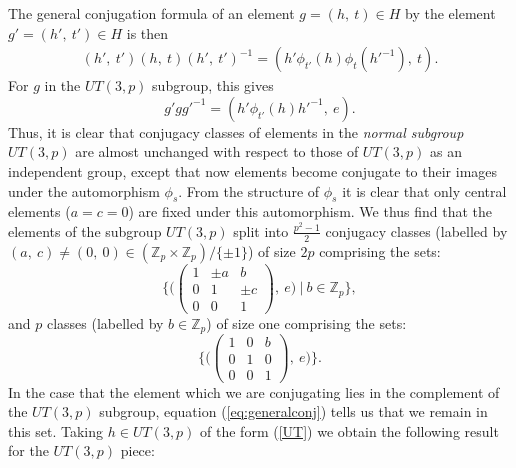 \documentclass[12pt]{article}
\theoremstyle{definition}
\begin{document}
The general conjugation formula of an element $g = (h,~t) \in H$ by the element $g' = (h',~t') \in H$ is then
\begin{equation}
\begin{gathered}
(h',~t')(h,~t)(h',~t')^{-1}  = (h'\phi_{t'}(h)\phi_t(h'^{-1}),~t).
\end{gathered}
\label{eq:generalconj}
\end{equation}
For $g$ in the $UT(3,p)$ subgroup, this gives
\begin{equation}
g'gg'^{-1} = (h'\phi_{t'}(h)h'^{-1},~e).
\end{equation}
Thus, it is clear that conjugacy classes of elements in the {\it normal subgroup} $UT(3,p)$ are almost unchanged with respect to those of $UT(3,p)$ as an independent group, except that now elements become conjugate to their images under the automorphism $\phi_s$. From the structure of $\phi_s$ it is clear that only central elements ($a=c=0$) are fixed under this automorphism. We thus find that the elements of the subgroup $UT(3,p)$ split into $\frac{p^2-1}{2}$ conjugacy classes (labelled by $(a,~c) \neq (0,~0) \in (\mathbb{Z}_p \times \mathbb{Z}_p)/\{\pm 1\}$) of size $2p$ comprising the sets:
\begin{equation}
\bigg\{ \bigg(
\begin{pmatrix}
1 & \pm a & b \\
0 & 1 & \pm c \\
0 & 0 & 1
\end{pmatrix},~e \bigg)~|~b \in \mathbb{Z}_p \bigg\},
\end{equation}
and $p$ classes (labelled by $b \in \mathbb{Z}_p$) of size one comprising the sets:
\begin{equation}
\bigg\{ \bigg(
\begin{pmatrix}
1 & 0 & b \\
0 & 1 & 0 \\
0 & 0 & 1
\end{pmatrix},~e \bigg) \bigg\}.
\end{equation}
In the case that the element which we are conjugating lies in the complement of the $UT(3,p)$ subgroup, equation (\ref{eq:generalconj}) tells us that we remain in this set. Taking $h \in UT(3,p)$ of the form (\ref{UT}) we obtain the following result for the $UT(3,p)$ piece:
\end{document}
